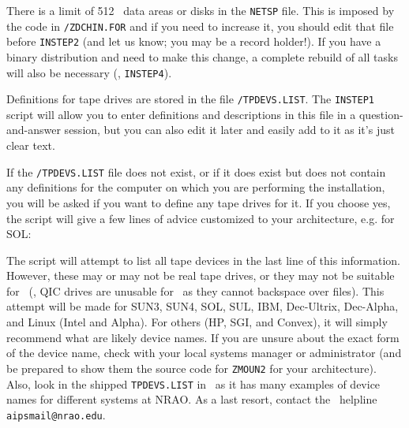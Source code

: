 There is a limit of 512 \aips\ data areas or disks in the {\tt NETSP}
file.  This is imposed by the code in {\tt\APLGEN/ZDCHIN.FOR} and if you
need to increase it, you should edit that file before {\tt INSTEP2} (and
let us know; you may be a record holder!).  If you have a binary
distribution and need to make this change, a complete rebuild of all
tasks will also be necessary (\ie, {\tt INSTEP4}).

\medskip{}

Definitions for tape drives are stored in the file
{\tt{}/TPDEVS.LIST}.  The {\tt INSTEP1} script will allow you to
enter definitions and descriptions in this file in a question-and-answer
session, but you can also edit it later and easily add to it as it's
just clear text.

If the {\tt{}/TPDEVS.LIST} file does not exist, or if it does exist
but does not contain any definitions for the computer on which you are
performing the installation, you will be asked if you want to define any
tape drives for it.  If you choose yes, the script will give a few lines
of advice customized to your architecture, e.g. for SOL:\medskip

\medskip


The script will attempt to list all tape devices in the last line of
this information.  However, these may or may not be real tape drives, or
they may not be suitable for \AIPS\ (\eg, QIC drives are unusable for
\AIPS\ as they cannot backspace over files).  This attempt will be made
for SUN3, SUN4, SOL, SUL, IBM, Dec-Ultrix, Dec-Alpha, and Linux (Intel
and Alpha).  For others (HP, SGI, and Convex), it will simply recommend
what are likely device names.  If you are unsure about the exact form of
the device name, check with your local systems manager or administrator
(and be prepared to show them the source code for {\tt ZMOUN2} for your
architecture).  Also, look in the shipped {\tt TPDEVS.LIST} in \SYSU\ as
it has many examples of device names for different systems at NRAO.  As
a last resort, contact the \AIPS\ helpline {\tt aipsmail@nrao.edu}.

